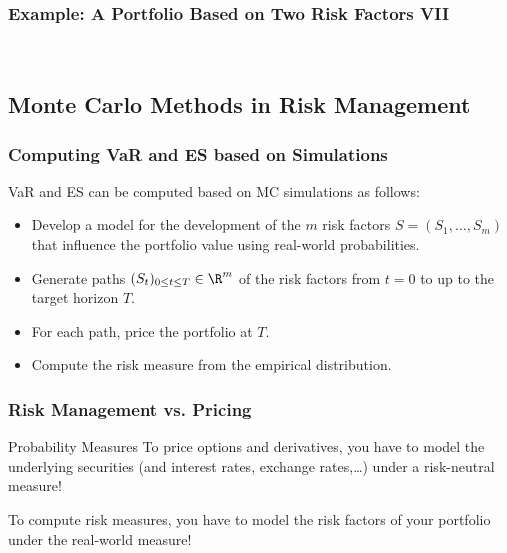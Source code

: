 \begin{frame}[fragile]
\frametitle{Example: A Portfolio Based on Two Risk Factors VII}
\begin{center}
\\

\end{center}
\end{frame}

\subsection{Monte Carlo Methods in Risk Management}
\begin{frame}[fragile]
\frametitle{Computing VaR and ES based on Simulations}
VaR and ES can be computed based on MC simulations as follows:
\begin{itemize}
  \item Develop a model for the development of the $m$ risk factors
  $S=(S_1,\ldots,S_m)$ that influence the portfolio value using real-world
  probabilities.
  \item Generate paths $(S_t)_{0\leq t\leq T}\in \R^m$ of the risk factors
  from $t=0$ to up to the target horizon $T$.
  \item For each path, price the portfolio at $T$.
  \item Compute the risk measure from the empirical distribution.
\end{itemize}
\end{frame}

\begin{frame}[fragile]
\frametitle{Risk Management vs. Pricing}
\begin{block}{Probability Measures}
To price options and derivatives, you have to model the underlying securities
(and interest rates, exchange rates,\ldots) under a risk-neutral measure!

To compute risk measures, you have to model the risk factors of your portfolio
under the real-world measure!
\end{block}
\end{frame}



